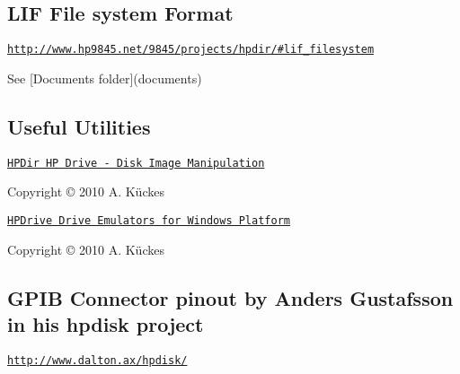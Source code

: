 \subsection*{L\+IF File system Format}


\begin{DoxyItemize}
\item \href{http://www.hp9845.net/9845/projects/hpdir/#lif_filesystem}{\tt http\+://www.\+hp9845.\+net/9845/projects/hpdir/\#lif\+\_\+filesystem}
\item See \mbox{[}Documents folder\mbox{]}(documents) 


\end{DoxyItemize}

\subsection*{Useful Utilities}


\begin{DoxyItemize}
\item \href{http://www.hp9845.net/9845/projects/hpdir}{\tt H\+P\+Dir HP Drive -\/ Disk Image Manipulation}
\begin{DoxyItemize}
\item Copyright © 2010 A. Kückes
\end{DoxyItemize}
\item \href{http://www.hp9845.net/9845/projects/hpdrive}{\tt H\+P\+Drive Drive Emulators for Windows Platform}
\begin{DoxyItemize}
\item Copyright © 2010 A. Kückes
\end{DoxyItemize}
\end{DoxyItemize}

\subsection*{G\+P\+IB Connector pinout by Anders Gustafsson in his hpdisk project}


\begin{DoxyItemize}
\item \href{http://www.dalton.ax/hpdisk/}{\tt http\+://www.\+dalton.\+ax/hpdisk/}
\end{DoxyItemize}



